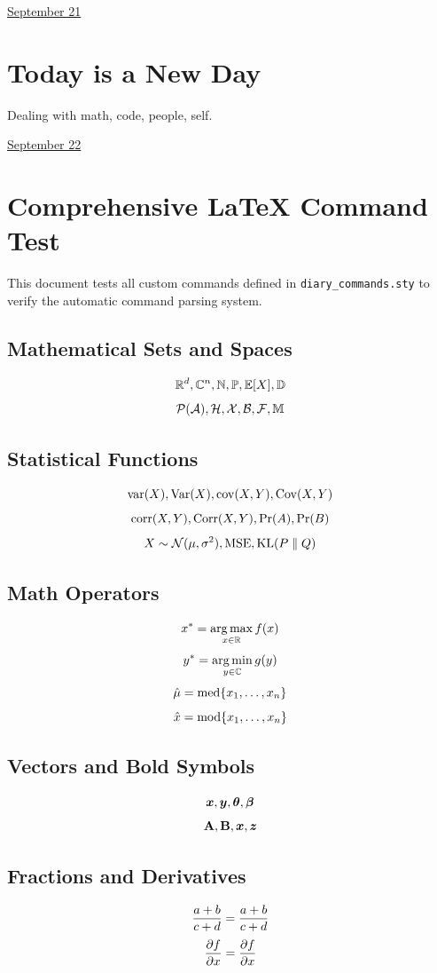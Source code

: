 \documentclass[letterpaper,11pt]{article}
\begin{document}
\clearpage


\href{run:2025-09-21.tex}{\Huge September 21} 

\section{Today is a New Day}

Dealing with math, code, people, self. 



\clearpage


\href{run:2025-09-22-command-test.tex}{\Huge September 22} 

\section{Comprehensive LaTeX Command Test}

This document tests all custom commands defined in \verb|diary_commands.sty| to verify the automatic command parsing system.

\subsection{Mathematical Sets and Spaces}
$$\mathbb{R}^d, \mathbb{C}^n, \mathbb{N}, \mathbb{P}, \mathbb{E}[X], \mathbb{D}$$
$$\mathcal{P}(\mathcal{A}), \mathcal{H}, \mathcal{X}, \mathcal{B}, \mathcal{F}, \mathbb{M}$$

\subsection{Statistical Functions}
$$\mathrm{var}(X), \mathrm{Var}(X), \mathrm{cov}(X,Y), \mathrm{Cov}(X,Y)$$
$$\mathrm{corr}(X,Y), \mathrm{Corr}(X,Y), \mathrm{Pr}(A), \mathrm{Pr}(B)$$
$$X \sim \mathcal{N}(\mu, \sigma^2), \mathrm{MSE}, \mathrm{KL}(P \parallel Q)$$

\subsection{Math Operators}
$$x^* = \operatorname*{arg\,max}_{x \in \mathbb{R}} f(x)$$
$$y^* = \operatorname*{arg\,min}_{y \in \mathbb{C}} g(y)$$
$$\hat{\mu} = \operatorname*{\mathrm{med}}\{x_1, \ldots, x_n\}$$
$$\hat{x} = \operatorname*{\mathrm{mod}}\{x_1, \ldots, x_n\}$$

\subsection{Vectors and Bold Symbols}
$$\boldsymbol{x}, \boldsymbol{y}, \boldsymbol{\theta}, \boldsymbol{\beta}$$
$$\mathbf{A}, \mathbf{B}, \boldsymbol{x}, \mbox{\boldmath$z$}$$

\subsection{Fractions and Derivatives}
$$\frac{\displaystyle a + b}{\displaystyle c + d} = \frac{\displaystyle a + b}{\displaystyle c + d}$$
$$\frac{\displaystyle \partial f}{\displaystyle \partial x} = \frac{\displaystyle \partial f}{\displaystyle \partial x}$$
\end{document}
